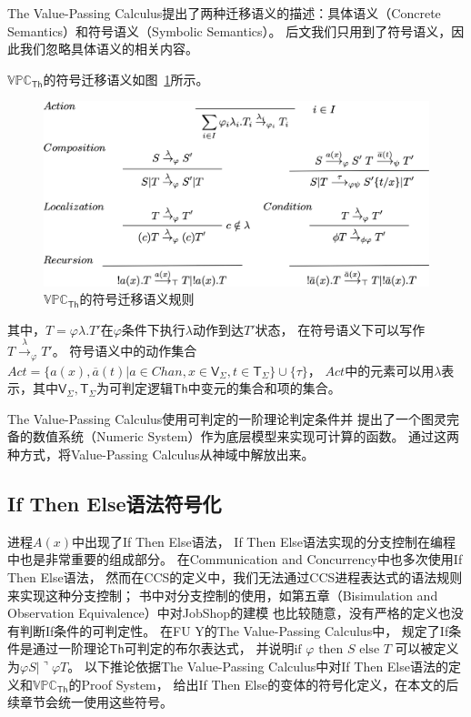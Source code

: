 The Value-Passing Calculus提出了两种迁移语义的描述：具体语义（Concrete Semantics）和符号语义（Symbolic Semantics）。
后文我们只用到了符号语义，因此我们忽略具体语义的相关内容。

$\mathbb{VPC}_{\mathsf{Th}}$的符号迁移语义如图~\ref{fig_vpc}所示。

\begin{figure}[!htbp]
   \small
   \centering
   \includegraphics[width=12cm]{../figures/vpc.png}
    \caption[]{$\mathbb{VPC}_{\mathsf{Th}}$的符号迁移语义规则}
    \label{fig_vpc}
\end{figure}
其中，$T=\varphi \lambda.T'$在$\varphi$条件下执行$\lambda$动作到达$T'$状态，
在符号语义下可以写作$T\stackrel{\lambda}{\rightarrow}_{\varphi}T'$。
符号语义中的动作集合$Act=\{a(x),\overline{a}(t)| a\in Chan, x\in \mathsf{V}_{\Sigma}, t\in \mathsf{T}_{\Sigma}\}\cup \{\tau\}$，
$Act$中的元素可以用$\lambda$表示，其中$\mathsf{V}_{\Sigma},\mathsf{T}_{\Sigma}$为可判定逻辑$\mathsf{Th}$中变元的集合和项的集合\cite{Fu_VPC}。

The Value-Passing Calculus使用可判定的一阶理论\cite{PA}判定条件并
提出了一个图灵完备的数值系统（Numeric System）\cite{Fu_VPC}作为底层模型来实现可计算的函数。
通过这两种方式，将Value-Passing Calculus从神域中解放出来。

\subsection{If Then Else语法符号化}
进程$A(x)$中出现了If Then Else语法，
If Then Else语法实现的分支控制在编程中也是非常重要的组成部分。
在Communication and Concurrency\cite{Milner_CCS}中也多次使用If Then Else语法，
然而在CCS的定义中，我们无法通过CCS进程表达式的语法规则来实现这种分支控制；
书中对分支控制的使用，如第五章（Bisimulation and Observation Equivalence）中对JobShop的建模\cite{Milner_CCS}
也比较随意，没有严格的定义也没有判断If条件的可判定性。
在FU Y的The Value-Passing Calculus\cite{Fu_VPC}中，
规定了If条件是通过一阶理论$\mathsf{Th}$可判定的布尔表达式，
并说明$\textrm{if }\varphi\textrm{ then }S\textrm{ else }T$
可以被定义为$\varphi S|\urcorner \varphi T$。
以下推论依据The Value-Passing Calculus中对If Then Else语法的定义和$\mathbb{VPC}_{\mathsf{Th}}$的Proof System\cite{Fu_VPC}，
给出If Then Else的变体的符号化定义，在本文的后续章节会统一使用这些符号。


